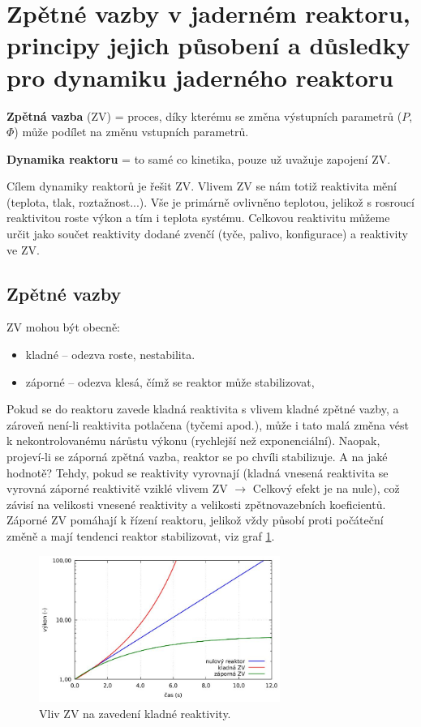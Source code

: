 \section[Zpětné vazby]{Zpětné vazby v jaderném reaktoru, principy jejich působení a důsledky pro dynamiku jaderného reaktoru}

\textbf{Zpětná vazba} (ZV) = proces, díky kterému se změna výstupních parametrů ($P$, $\Phi$) může podílet na změnu vstupních parametrů.

\textbf{Dynamika reaktoru} = to samé co kinetika, pouze už uvažuje zapojení ZV.

Cílem dynamiky reaktorů je řešit ZV. Vlivem ZV se nám totiž reaktivita mění (teplota, tlak, roztažnost...). Vše je primárně ovlivněno teplotou, jelikož s rosroucí reaktivitou roste výkon a tím i teplota systému. Celkovou reaktivitu můžeme určit jako součet reaktivity dodané zvenčí (tyče, palivo, konfigurace) a reaktivity ve ZV.

\subsection{Zpětné vazby}

ZV mohou být obecně:

\begin{itemize}
  \item kladné -- odezva roste, nestabilita.
  \item záporné -- odezva klesá, čímž se reaktor může stabilizovat,
\end{itemize}

Pokud se do reaktoru zavede kladná reaktivita s vlivem kladné zpětné vazby, a zároveň není-li reaktivita potlačena (tyčemi apod.), může i tato malá změna vést k nekontrolovanému nárůstu výkonu (rychlejší než exponenciální). Naopak, projeví-li se záporná zpětná vazba, reaktor se po chvíli stabilizuje. A na jaké hodnotě? Tehdy, pokud se reaktivity vyrovnají (kladná vnesená reaktivita se vyrovná záporné reaktivitě vziklé vlivem ZV $\rightarrow$ Celkový efekt je na nule), což závisí na velikosti vnesené reaktivity a velikosti zpětnovazebních koeficientů. Záporné ZV pomáhají k řízení reaktoru, jelikož vždy působí proti počáteční změně a mají tendenci reaktor stabilizovat, viz graf \ref{ZV}.

\begin{figure}[H]
  \centering
  \includegraphics[width=0.7\textwidth]{img/ZV.JPG}
  \caption{Vliv ZV na zavedení kladné reaktivity.}
  \label{ZV}
\end{figure}

